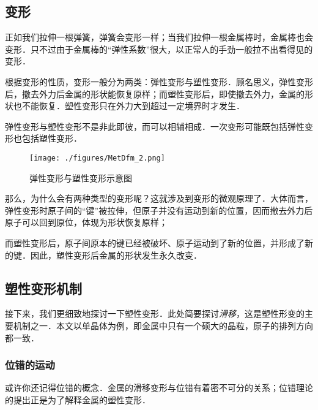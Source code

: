 
\subsection{变形}
正如我们拉伸一根弹簧，弹簧会变形一样；当我们拉伸一根金属棒时，金属棒也会变形．只不过由于金属棒的“弹性系数”很大，以正常人的手劲一般拉不出看得见的变形．

\begin{example}{}
\begin{figure}[ht]
\centering
\texttt{[image: ./figures/MetDfm\_1.png]}
\caption{框架结构}} \label{MetDfm_fig1}
\end{figure}
与弹簧类似，金属结构提供的支持力也源自金属的细微变形．．．只要在安全的范围内．
\end{example}

根据变形的性质，变形一般分为两类：弹性变形与塑性变形．顾名思义，弹性变形后，撤去外力后金属的形状能恢复原样；而塑性变形后，即使撤去外力，金属的形状也不能恢复．塑性变形只在外力大到超过一定境界时才发生．

弹性变形与塑性变形不是非此即彼，而可以相辅相成．一次变形可能既包括弹性变形也包括塑性变形．

\begin{figure}[ht]
\centering
\texttt{[image: ./figures/MetDfm\_2.png]}
\caption{弹性变形与塑性变形示意图} \label{MetDfm_fig2}
\end{figure}

那么，为什么会有两种类型的变形呢？这就涉及到变形的微观原理了．大体而言，弹性变形时原子间的“键”被拉伸，但原子并没有运动到新的位置，因而撤去外力后原子可以回到原位，体现为形状恢复原样；

而塑性变形后，原子间原本的键已经被破坏、原子运动到了新的位置，并形成了新的键．因此，塑性变形后金属的形状发生永久改变．

\subsection{塑性变形机制}
接下来，我们更细致地探讨一下塑性变形．此处简要探讨\textsl{滑移}，这是塑性形变的主要机制之一．本文以单晶体为例，即金属中只有一个硕大的晶粒，原子的排列方向都一致．

\subsubsection{位错的运动}
或许你还记得位错的概念．金属的滑移变形与位错有着密不可分的关系；位错理论的提出正是为了解释金属的塑性变形．

